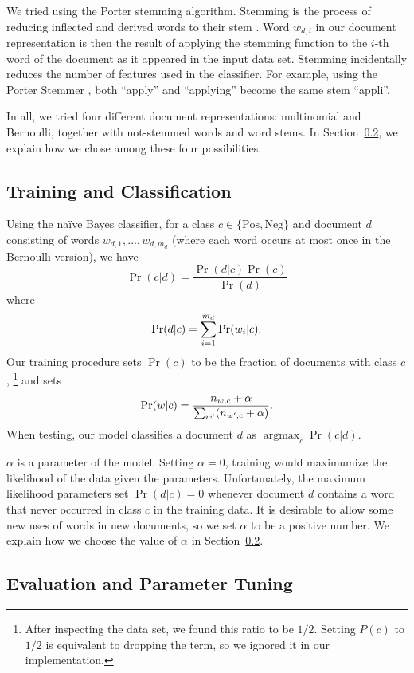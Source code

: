 \documentclass{article}
\DeclareMathOperator{\Argmax}{argmax}
\newcommand{\PosC}{\mathrm{Pos}}
\newcommand{\NegC}{\mathrm{Neg}}
\begin{document}
We tried using the Porter stemming algorithm.
Stemming is the process of reducing inflected and derived words to their stem \cite{porter-stemmer}.
Word \(w_{d,i}\) in our document representation is then the result of applying the stemming function to the \(i\)-th word of the document as it appeared in the input data set.
Stemming incidentally reduces the number of features used in the classifier.
For example, using the Porter Stemmer \cite{porter-stemmer}, both ``apply'' and ``applying'' become the same stem ``appli''.


In all, we tried four different document representations: multinomial and Bernoulli, together with not-stemmed words and word stems.
In Section~\ref{sec:EvalAndTuning}, we explain how we chose among these four possibilities.

\subsection{Training and Classification}

Using the na\"ive Bayes classifier, for a class \(c \in \{\PosC, \NegC\}\) and document \(d\) consisting of words \(w_{d,1},\dotsc,w_{d,m_d}\) (where each word occurs at most once in the Bernoulli version), we have
\[\Pr(c|d)=\frac{\Pr(d|c)\Pr(c)}{\Pr(d)}\]
where
\[\Pr(d|c)=\sum_{i=1}^{m_d}\Pr(w_i|c)\ldotp\]
Our training procedure sets \(\Pr(c)\) to be the fraction of documents with class \(c\),%
\footnote{After inspecting the data set, we found this ratio to be \(1/2\).  Setting \(P(c)\) to \(1/2\) is equivalent to dropping the term, so we ignored it in our implementation.}
and sets
\[\Pr(w|c)=\frac{n_{w,c}+\alpha}{\sum_{w'}(n_{w',c}+\alpha)}\ldotp\]
When testing, our model classifies a document \(d\) as \(\Argmax_c\Pr(c|d)\).

\(\alpha\) is a parameter of the model.
Setting \(\alpha=0\), training would maximumize the likelihood of the data given the parameters.
Unfortunately, the maximum likelihood parameters set \(\Pr(d|c)=0\) whenever document \(d\) contains a word that never occurred in class \(c\) in the training data.
It is desirable to allow some new uses of words in new documents, so we set \(\alpha\) to be a positive number.
We explain how we choose the value of \(\alpha\) in Section~\ref{sec:EvalAndTuning}.

\subsection{Evaluation and Parameter Tuning}
\label{sec:EvalAndTuning}
\end{document}
